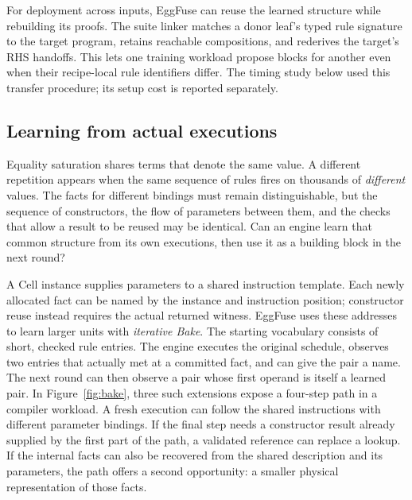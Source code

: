\documentclass[10pt,letterpaper]{article}
\begin{document}
For deployment across inputs, EggFuse can reuse the learned structure while rebuilding its proofs. The suite linker matches a donor leaf's typed rule signature to the target program, retains reachable compositions, and rederives the target's RHS handoffs. This lets one training workload propose blocks for another even when their recipe-local rule identifiers differ. The timing study below used this transfer procedure; its setup cost is reported separately.

\subsection{Learning from actual executions}
Equality saturation shares terms that denote the same value. A different repetition appears when the same sequence of rules fires on thousands of \emph{different} values. The facts for different bindings must remain distinguishable, but the sequence of constructors, the flow of parameters between them, and the checks that allow a result to be reused may be identical. Can an engine learn that common structure from its own executions, then use it as a building block in the next round?

A Cell instance supplies parameters to a shared instruction template. Each newly allocated fact can be named by the instance and instruction position; constructor reuse instead requires the actual returned witness. EggFuse uses these addresses to learn larger units with \emph{iterative Bake}. The starting vocabulary consists of short, checked rule entries. The engine executes the original schedule, observes two entries that actually met at a committed fact, and can give the pair a name. The next round can then observe a pair whose first operand is itself a learned pair. In Figure~\ref{fig:bake}, three such extensions expose a four-step path in a compiler workload. A fresh execution can follow the shared instructions with different parameter bindings. If the final step needs a constructor result already supplied by the first part of the path, a validated reference can replace a lookup. If the internal facts can also be recovered from the shared description and its parameters, the path offers a second opportunity: a smaller physical representation of those facts.
\end{document}
